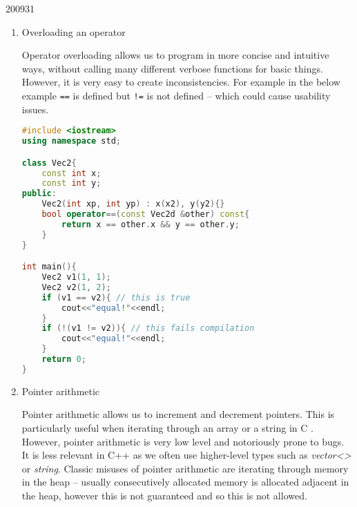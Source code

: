 \documentclass[10pt,\jkfside,a4paper]{article}
\begin{document}
\begin{examquestion}{2009}{3}{1}
\begin{enumerate}[label=(\alph*)]
\begin{lstlisting}[language=C]
void free_list(struct list *lst){
	while (*lst){
		struct list *tmp = lst;
		lst = lst->next;
		free(tmp);
	}
}

int main(void){
	// allocates 8 bytes on the heap and returns an untyped pointer.
	void *p = malloc(10000);
	// we can then interpret these bytes however we want
	int *i = p;
	struct list *l = p;
	l->next = malloc(8);
	/* there is no way to define a destructor in C with free
	 * so free(l) will cause a memory leak
	 * we have to define our own function to free memory and remember
	 * the actual type and call the correct function to deallocate the
	 * data */
	free_list(l);
}
\end{lstlisting}

\begin{lstlisting}[language=C++]
#include <vector>
using namespace std;

struct A{
	vector<int> *vec = new vector<int>(10000, 0);
	A()= default;
	~A(){
		delete vec;
	}
}
int main(){
	A *a = new A(); // the return type is typed and initialised
	delete a; // the destructor is run so vec is also deallocated
	return 0;
}
\end{lstlisting}

\item Overloading an operator

Operator overloading allows us to program in more concise and intuitive
ways, without calling many different verbose functions for basic things.
However, it is very easy to create inconsistencies. For example in the
below example \texttt{==} is defined but \texttt{!=} is not defined -- which
could cause usability issues.

\begin{lstlisting}[language=C++]
#include <iostream>
using namespace std;

class Vec2{
	const int x;
	const int y;
public:
	Vec2(int xp, int yp) : x(x2), y(y2){}
	bool operator==(const Vec2d &other) const{
		return x == other.x && y == other.y;
	}
}

int main(){
	Vec2 v1(1, 1);
	Vec2 v2(1, 2);
	if (v1 == v2){ // this is true
		cout<<"equal!"<<endl;
	}
	if (!(v1 != v2)){ // this fails compilation
		cout<<"equal!"<<endl;
	}
	return 0;
}

\end{lstlisting}

\item Pointer arithmetic

Pointer arithmetic allows us to increment and decrement pointers. This is
particularly useful when iterating through an array or a string in C .
However, pointer arithmetic is very low level and notoriously prone to bugs.
It is less relevant in C++ as we often use higher-level types such as
\textit{vector<>} or \textit{string}. Classic misuses of pointer arithmetic
are iterating through memory in the heap -- usually consecutively allocated
memory is allocated adjacent in the heap, however this is not guaranteed and
so this is not allowed.


\end{enumerate}
\end{examquestion}
\end{document}
